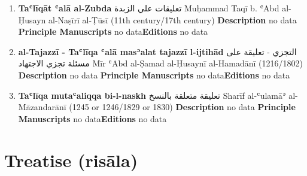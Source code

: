 \documentclass{article}
\begin{document}
\begin{enumerate}
      \item \textbf{Taʿlīqāt ʿalā al-Zubda}
        \newline
        \textarabic{تعليقات علي الزبدة}
        \newline
        Muḥammad Taqī b. ʿAbd al-Ḥusayn al-Naṣīrī al-Ṭūsī
        \newline
        (11th century/17th century)
        \newline
        \newline
        \textbf{Description}
        \newline	
        no data
        \newline
        \newline
    \textbf{Principle Manuscripts}
\newline
no data\newline\textbf{Editions}
\newline
no data\newline
      \item \textbf{al-Tajazzī - Taʿlīqa ʿalā masʾalat tajazzī l-ijtihād}
        \newline
        \textarabic{التجزي - تعليقة على مسئلة تجزي الاجتهاد}
        \newline
        Mīr ʿAbd al-Ṣamad al-Ḥusaynī al-Hamadānī
        \newline
        (1216/1802)
        \newline
        \newline
        \textbf{Description}
        \newline	
        no data
        \newline
        \newline
    \textbf{Principle Manuscripts}
\newline
no data\newline\textbf{Editions}
\newline
no data\newline
      \item \textbf{Taʿlīqa mutaʿaliqqa bi-l-naskh}
        \newline
        \textarabic{تعليقة متعلقة بالنسخ}
        \newline
        Sharīf al-ʿulamāʾ al-Māzandarānī
        \newline
        (1245 or 1246/1829 or 1830)
        \newline
        \newline
        \textbf{Description}
        \newline	
        no data
        \newline
        \newline
    \textbf{Principle Manuscripts}
\newline
no data\newline\textbf{Editions}
\newline
no data\newline\end{enumerate}\section{Treatise (risāla)}
\end{document}
